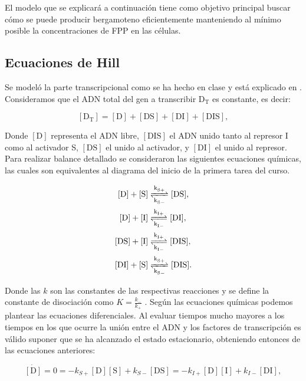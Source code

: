 \documentclass[12pt]{article}
\begin{document}
El modelo que se explicar\'a a continuaci\'on tiene como objetivo principal buscar c\'omo se puede producir bergamoteno eficientemente manteniendo al m\'inimo posible la concentraciones de FPP en las c\'elulas.

\subsection{Ecuaciones de Hill}

Se model\'o la parte transcripcional como se ha hecho en clase y est\'a explicado en \cite{alon06}. Consideramos que el ADN total del gen a transcribir $\text{D}_{\text{T}}$ es constante, es decir:

\begin{equation} \label{eq:D_T}
[\text{D}_{\text{T}}]=[\text{D}]+[\text{DS}]+[\text{DI}]+[\text{DIS}],
\end{equation}

Donde $[\text{D}]$ representa el ADN libre, $[\text{DIS}]$ el ADN unido tanto al represor I como al activador S, $[\text{DS}]$ el unido al activador, y $[\text{DI}]$ el unido al represor.\\

Para realizar balance detallado se consideraron las siguientes ecuaciones qu\'imicas, las cuales son equivalentes al diagrama del inicio  de la primera tarea del curso.

\begin{align}
\ce{[D] + [S]} &\ce{<=>[\ce{k_{S+}}][\ce{k_{S-}}] [DS]}, \label{eq:rchem1}\\ 
\ce{[D] + [I]} &\ce{<=>[\ce{k_{I+}}][\ce{k_{I-}}] [DI]}, \label{eq:rchem2}\\
\ce{[DS] + [I]} &\ce{ <=>[\ce{k_{I+}}][\ce{k_{I-}}] [DIS]}, \label{eq:rchem3}\\ 
\ce{[DI] + [S]} &\ce{<=>[\ce{k_{S+}}][\ce{k_{S-}}] [DIS]}. \label{eq:rchem4}
\end{align}

Donde las $k$ son las constantes de las respectivas reacciones y se define la constante de disociaci\'on como $K = \frac{k_-}{k_+}$ \cite{alon06}. Seg\'un las ecuaciones qu\'imicas podemos plantear las ecuaciones diferenciales. Al evaluar tiempos mucho mayores a los tiempos en los que ocurre la uni\'on entre el ADN y los factores de transcripci\'on es v\'alido suponer que se ha alcanzado el estado estacionario, obteniendo entonces de las ecuaciones anteriores:

\begin{equation}
\label{eq:Dss}
\dot{[\text{D}]}=0=-k_{S+}[\text{D}][\text{S}]+k_{S-}[\text{DS}]=-k_{I+}[\text{D}][\text{I}]+k_{I-}[\text{DI}],
\end{equation}
\end{document}
